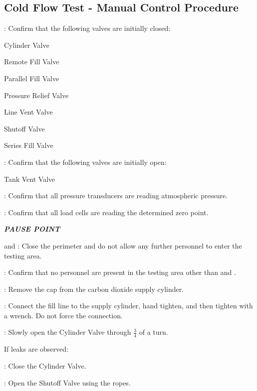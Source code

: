 \subsection{Cold Flow Test - Manual Control Procedure}
\begin{checklist}
    \item \primary{}: Confirm that the following valves are initially closed:
    \begin{checklist}
        \item Cylinder Valve
        \item Remote Fill Valve
        \item Parallel Fill Valve
        \item Pressure Relief Valve
        \item Line Vent Valve
        \item Shutoff Valve
        \item Series Fill Valve
    \end{checklist}
    \item \primary{}: Confirm that the following valves are initially open:
    \item Tank Vent Valve
    \item \daq{}: Confirm that all pressure transducers are reading atmospheric pressure.
    \item \daq{}: Confirm that all load cells are reading the determined zero point.
    \item \textbf{\textit{PAUSE POINT}}
    \item \peri{} and \perii{}: Close the perimeter and do not allow any further personnel to enter the testing area.
    \item \secondary: Confirm that no personnel are present in the testing area other than \primary{} and \secondary.
    \item \primary{}: Remove the cap from the carbon dioxide supply cylinder.
    \item \primary{}: Connect the fill line to the supply cylinder, hand tighten, and then tighten with a wrench. Do not force the connection.
    \item \primary{}: Slowly open the Cylinder Valve through $\frac{3}{4}$ of a turn.
    \begin{checklist}[label=$\bullet$]
        \item If leaks are observed:
        \begin{checklist}
            \item \primary{}: Close the Cylinder Valve.
            \item \primary{}: Open the Shutoff Valve using the ropes.

\end{checklist}
\end{checklist}
\end{checklist}
